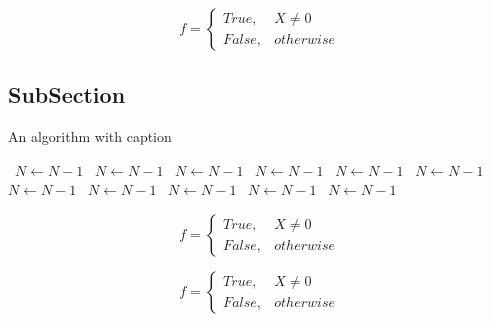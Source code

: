 \documentclass[a4paper]{article}
\begin{document}
\begin{equation}   f =
\begin{cases} True, & X \neq 0\\
False, & otherwise
\end{cases}
\end{equation}

\subsection{SubSection}

\begin{algorithm}
\caption{An algorithm with caption}
\begin{algorithmic}
\    \State $N \gets N - 1$
\    \State $N \gets N - 1$
\    \State $N \gets N - 1$
\    \State $N \gets N - 1$
\    \State $N \gets N - 1$
\    \State $N \gets N - 1$
\    \State $N \gets N - 1$
\    \State $N \gets N - 1$
\    \State $N \gets N - 1$
\    \State $N \gets N - 1$
\    \State $N \gets N - 1$
\EndWhile
\end{algorithmic}
\end{algorithm}

\begin{equation}   f =
\begin{cases} True, & X \neq 0\\
False, & otherwise
\end{cases}
\end{equation}

\begin{equation}   f =
\begin{cases} True, & X \neq 0\\
False, & otherwise
\end{cases}
\end{equation}
\end{document}
